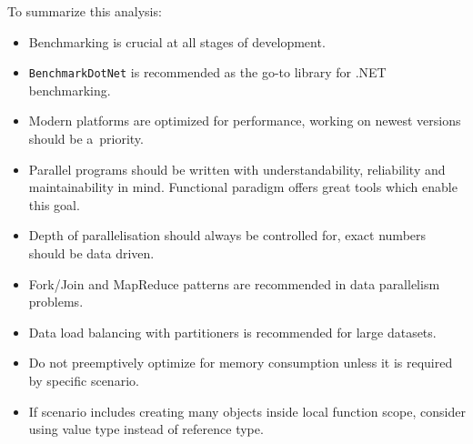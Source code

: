 To summarize this analysis: 
\begin{itemize}
	\item Benchmarking is crucial at all stages of development.
	\item \texttt{BenchmarkDotNet} is recommended as the go-to library for .NET benchmarking.
	\item Modern platforms are optimized for performance, working on newest versions should be a~priority.
	\item Parallel programs should be written with understandability, reliability and maintainability in mind. Functional paradigm offers great tools which enable this goal.
	\item Depth of parallelisation should always be controlled for, exact numbers should be data driven.
	\item Fork/Join and MapReduce patterns are recommended in data parallelism problems. 
	\item Data load balancing with partitioners is recommended for large datasets.
	\item Do not preemptively optimize for memory consumption unless it is required by specific scenario.
	\item If scenario includes creating many objects inside local function scope, consider using value type instead of reference type.

\end{itemize}
